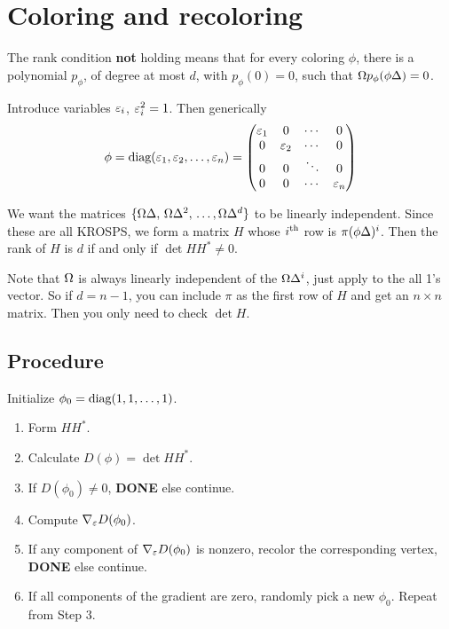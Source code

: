 


\section{Coloring and recoloring}


The rank condition {\bf not} holding means that for every coloring $\phi$, there is a
polynomial $p_\phi$, of degree at most $d$, with $p_\phi(0)=0$,
such that $\Omega p_\phi(\phi\Delta)=0$.



Introduce variables $\varepsilon_i$, $\varepsilon_i^2=1$. Then generically
$$\phi=\hbox{diag}(\vep_1,\vep_2,\ldots,\vep_n)=
  \begin{pmatrix} 
	\vep_1&0&\cdots&0\cr 0&\vep_2&\cdots&0  \\ %
          0&0&\ddots&0 \\		%
          0&0&\cdots&\vep_n
   \end{pmatrix}	%
$$


We want the matrices $\{\Omega\Delta,\,\Omega\Delta^2,\,\ldots, \Omega\Delta^d\}$ to be linearly
independent. Since these are all KROSPS, we form a matrix $H$ whose $i^{\rm th}$ row
is $\pi(\phi\Delta)^i$. Then the rank of $H$ is $d$ if and only if $\det HH^*\ne0$.
\bigskip


\begin{remark} Note that $\Omega$ is always linearly independent of the $\Omega\Delta^i$, just apply
to the all 1's vector. So if $d=n-1$, you can include $\pi$ as the first row of $H$ and get
an $n\times n$ matrix. Then you only need to check $\det H$.
\end{remark}



\subsection*{Procedure}

Initialize $\phi_0=\hbox{diag}(1,1,\ldots,1)$. 

\begin{enumerate}
\item[1.] Form $HH^*$.
\item[2.] Calculate $D(\phi)=\det HH^*$.
\item[3.] If $D(\phi_0)\ne0$, {\bf DONE} else continue.
\item[4.] Compute $\nabla_\varepsilon D(\phi_0)$.
\item[5.] If any component of $\nabla_\varepsilon D(\phi_0)$ is nonzero, recolor the corresponding vertex, {\bf DONE} else continue.
\item[6.] If all components of the gradient are zero, randomly pick a new $\phi_0$. Repeat from Step 3.
\end{enumerate}




